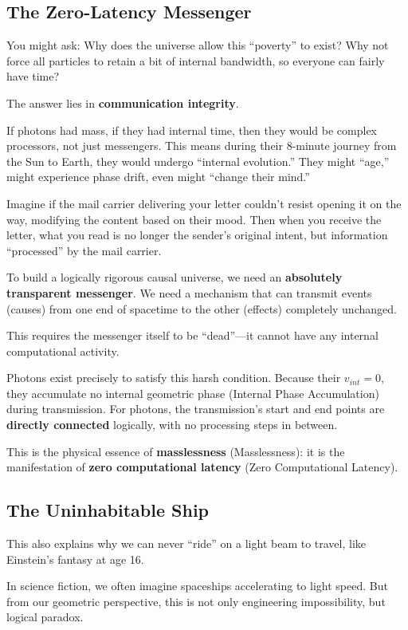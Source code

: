 \documentclass[11pt,a4paper,twoside]{book}
\begin{document}
\subsection{The Zero-Latency Messenger}

You might ask: Why does the universe allow this ``poverty'' to exist? Why not force all particles to retain a bit of internal bandwidth, so everyone can fairly have time?

The answer lies in \textbf{communication integrity}.

If photons had mass, if they had internal time, then they would be complex processors, not just messengers. This means during their 8-minute journey from the Sun to Earth, they would undergo ``internal evolution.'' They might ``age,'' might experience phase drift, even might ``change their mind.''

Imagine if the mail carrier delivering your letter couldn't resist opening it on the way, modifying the content based on their mood. Then when you receive the letter, what you read is no longer the sender's original intent, but information ``processed'' by the mail carrier.

To build a logically rigorous causal universe, we need an \textbf{absolutely transparent messenger}. We need a mechanism that can transmit events (causes) from one end of spacetime to the other (effects) completely unchanged.

This requires the messenger itself to be ``dead''---it cannot have any internal computational activity.

Photons exist precisely to satisfy this harsh condition. Because their $v_{int}=0$, they accumulate no internal geometric phase (Internal Phase Accumulation) during transmission. For photons, the transmission's start and end points are \textbf{directly connected} logically, with no processing steps in between.

This is the physical essence of \textbf{masslessness} (Masslessness): it is the manifestation of \textbf{zero computational latency} (Zero Computational Latency).

\subsection{The Uninhabitable Ship}

This also explains why we can never ``ride'' on a light beam to travel, like Einstein's fantasy at age 16.

In science fiction, we often imagine spaceships accelerating to light speed. But from our geometric perspective, this is not only engineering impossibility, but logical paradox.
\end{document}
